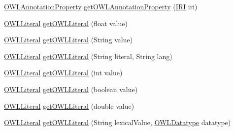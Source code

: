\begin{DoxyCompactItemize}
\item 
\hyperlink{interfaceorg_1_1semanticweb_1_1owlapi_1_1model_1_1_o_w_l_annotation_property}{O\-W\-L\-Annotation\-Property} \hyperlink{classuk_1_1ac_1_1manchester_1_1cs_1_1owl_1_1owlapi_1_1_internals_no_cache_aff230d3a47e2b170ebc91ba987fb283a}{get\-O\-W\-L\-Annotation\-Property} (\hyperlink{classorg_1_1semanticweb_1_1owlapi_1_1model_1_1_i_r_i}{I\-R\-I} iri)
\item 
\hyperlink{interfaceorg_1_1semanticweb_1_1owlapi_1_1model_1_1_o_w_l_literal}{O\-W\-L\-Literal} \hyperlink{classuk_1_1ac_1_1manchester_1_1cs_1_1owl_1_1owlapi_1_1_internals_no_cache_a6bd52a101511ad494f5e81b39c2684f2}{get\-O\-W\-L\-Literal} (float value)
\item 
\hyperlink{interfaceorg_1_1semanticweb_1_1owlapi_1_1model_1_1_o_w_l_literal}{O\-W\-L\-Literal} \hyperlink{classuk_1_1ac_1_1manchester_1_1cs_1_1owl_1_1owlapi_1_1_internals_no_cache_a887403bae79fc52a3ceb1ea14f0e92b5}{get\-O\-W\-L\-Literal} (String value)
\item 
\hyperlink{interfaceorg_1_1semanticweb_1_1owlapi_1_1model_1_1_o_w_l_literal}{O\-W\-L\-Literal} \hyperlink{classuk_1_1ac_1_1manchester_1_1cs_1_1owl_1_1owlapi_1_1_internals_no_cache_a670d3adc28ecbba585f85275e27f161a}{get\-O\-W\-L\-Literal} (String literal, String lang)
\item 
\hyperlink{interfaceorg_1_1semanticweb_1_1owlapi_1_1model_1_1_o_w_l_literal}{O\-W\-L\-Literal} \hyperlink{classuk_1_1ac_1_1manchester_1_1cs_1_1owl_1_1owlapi_1_1_internals_no_cache_a4859a53aefa269aa8266d8d70ee20101}{get\-O\-W\-L\-Literal} (int value)
\item 
\hyperlink{interfaceorg_1_1semanticweb_1_1owlapi_1_1model_1_1_o_w_l_literal}{O\-W\-L\-Literal} \hyperlink{classuk_1_1ac_1_1manchester_1_1cs_1_1owl_1_1owlapi_1_1_internals_no_cache_a413b5607b18fc35c8ab4060f6ac28164}{get\-O\-W\-L\-Literal} (boolean value)
\item 
\hyperlink{interfaceorg_1_1semanticweb_1_1owlapi_1_1model_1_1_o_w_l_literal}{O\-W\-L\-Literal} \hyperlink{classuk_1_1ac_1_1manchester_1_1cs_1_1owl_1_1owlapi_1_1_internals_no_cache_a8d0aae9094f8eb26ec0a26992270432d}{get\-O\-W\-L\-Literal} (double value)
\item 
\hyperlink{interfaceorg_1_1semanticweb_1_1owlapi_1_1model_1_1_o_w_l_literal}{O\-W\-L\-Literal} \hyperlink{classuk_1_1ac_1_1manchester_1_1cs_1_1owl_1_1owlapi_1_1_internals_no_cache_a567aa18a6a94428581aa2e41ad8c0296}{get\-O\-W\-L\-Literal} (String lexical\-Value, \hyperlink{interfaceorg_1_1semanticweb_1_1owlapi_1_1model_1_1_o_w_l_datatype}{O\-W\-L\-Datatype} datatype)

\end{DoxyCompactItemize}
